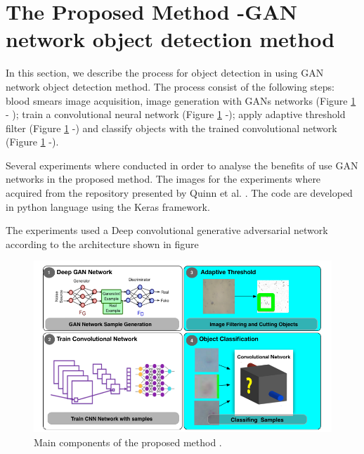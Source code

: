 \section{The Proposed Method -GAN network object detection method}
\label{segmethod}

In this section, we describe the process for object detection in using GAN network object detection method. The process consist of the following steps: blood smears image acquisition, image generation with GANs networks (Figure \ref{fig:maincomp} - ); train a convolutional neural network (Figure \ref{fig:maincomp} -);  apply adaptive  threshold filter (Figure \ref{fig:maincomp} -) and classify objects with the trained convolutional network (Figure \ref{fig:maincomp} -). 

Several experiments where conducted in order to analyse the benefits of use GAN networks in the proposed method. The images for the experiments where acquired from the repository presented by Quinn et al. \cite{Quinn2016DeepDiagnostics}.  The code are developed in python language using the Keras framework.

The experiments used a Deep convolutional generative adversarial network according to the architecture shown in figure




\begin{figure}[h]
\caption{Main components of the proposed method .}
\label{fig:maincomp}
  \includegraphics[width=\textwidth]{images/MainComponents.png}
  
\end{figure}



